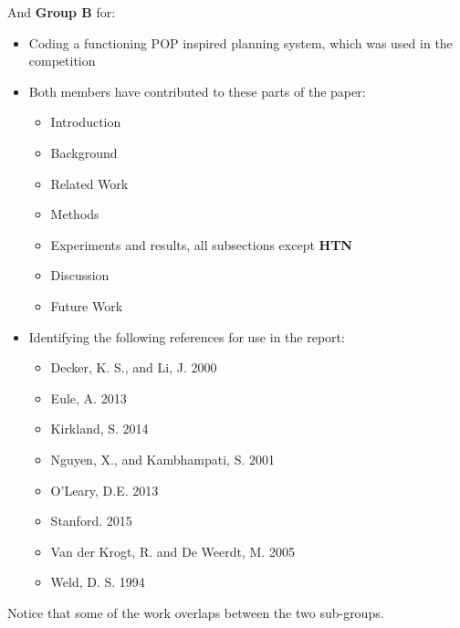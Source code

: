 \documentclass[letterpaper]{article}
\begin{document}
And \textbf{Group B} for:
\begin{itemize}
\item Coding a functioning POP inspired planning system, which was used in the competition
\item Both members have contributed to these parts of the paper:
  \begin{itemize}
  \item Introduction
  \item Background
  \item Related Work
  \item Methods
  \item Experiments and results, all subsections except \textbf{HTN}
  \item Discussion
  \item Future Work
  \end{itemize}
\item Identifying the following references for use in the report:
  \begin{itemize}
  \item Decker, K. S., and Li, J. 2000
  \item Eule, A. 2013
  \item Kirkland, S. 2014
  \item Nguyen, X., and Kambhampati, S. 2001
  \item O'Leary, D.E. 2013
  \item Stanford. 2015
  \item Van der Krogt, R. and De Weerdt, M. 2005
  \item Weld, D. S. 1994
  \end{itemize}
\end{itemize}

Notice that some of the work overlaps between the two sub-groups.
\end{document}

